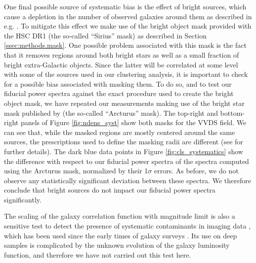 \documentclass[a4paper,11pt]{article}
\begin{document}
      One final possible source of systematic bias is the effect of bright sources, which cause a depletion in the number of observed galaxies around them as described in e.g. \cite{2018PASJ...70S...7C}. To mitigate this effect we make use of the bright object mask provided with the HSC DR1 (the so-called ``Sirius'' mask) as described in Section \ref{ssec:methods.mask}. One possible problem associated with this mask is the fact that it removes regions around both bright stars as well as a small fraction of bright extra-Galactic objects. Since the latter will be correlated at some level with some of the sources used in our clustering analysis, it is important to check for a possible bias associated with masking them. To do so, and to test our fiducial power spectra against the exact procedure used to create the bright object mask, we have repeated our measurements making use of the bright star mask published by \cite{2018PASJ...70S...7C} (the so-called ``Arcturus'' mask). The top-right and bottom-right panels of Figure \ref{fig:ndens_syst} show both masks for the VVDS field. We can see that, while the masked regions are mostly centered around the same sources, the prescriptions used to define the masking radii are different (see \cite{2018PASJ...70S...7C} for further details). The dark blue data points in Figure \ref{fig:cls_systematics} show the difference with respect to our fiducial power spectra of the spectra computed using the Arcturus mask, normalized by their 1$\sigma$ errors. As before, we do not observe any statistically significant deviation between these spectra. We therefore conclude that bright sources do not impact our fiducial power spectra significantly.
      
      The scaling of the galaxy correlation function with magnitude limit is also a sensitive test to detect the presence of systematic contaminants in imaging data \citep{BookPeeblesLSS}, which has been used since the early times of galaxy surveys \citep{1996MNRAS.283.1227M}. Its use on deep samples is complicated by the unknown evolution of the galaxy luminosity function, and therefore we have not carried out this test here.
      
\end{document}
